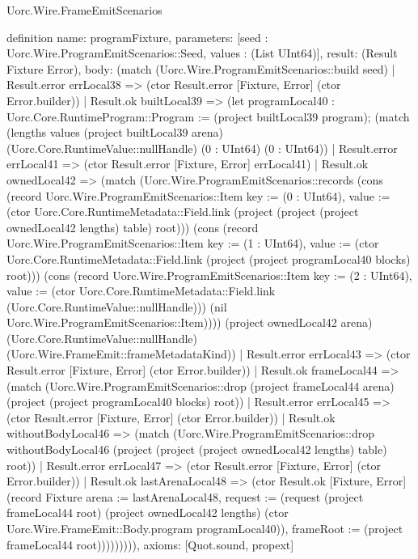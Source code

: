 \begin{lexlean}{Uorc.Wire.FrameEmitScenarios}
\begin{semanticmodule}
definition{
  name: programFixture,
  parameters: [seed : Uorc.Wire.ProgramEmitScenarios::Seed, values : (List UInt64)],
  result: (Result Fixture Error),
  body: (match (Uorc.Wire.ProgramEmitScenarios::build seed)
    | Result.error errLocal38 => (ctor Result.error [Fixture, Error] (ctor Error.builder))
    | Result.ok builtLocal39 => (let programLocal40 : Uorc.Core.RuntimeProgram::Program := (project builtLocal39 program); (match (lengths values (project builtLocal39 arena) (Uorc.Core.RuntimeValue::nullHandle) (0 : UInt64) (0 : UInt64))
      | Result.error errLocal41 => (ctor Result.error [Fixture, Error] errLocal41)
      | Result.ok ownedLocal42 => (match (Uorc.Wire.ProgramEmitScenarios::records (cons (record Uorc.Wire.ProgramEmitScenarios::Item {key := (0 : UInt64), value := (ctor Uorc.Core.RuntimeMetadata::Field.link (project (project (project ownedLocal42 lengths) table) root))}) (cons (record Uorc.Wire.ProgramEmitScenarios::Item {key := (1 : UInt64), value := (ctor Uorc.Core.RuntimeMetadata::Field.link (project (project programLocal40 blocks) root))}) (cons (record Uorc.Wire.ProgramEmitScenarios::Item {key := (2 : UInt64), value := (ctor Uorc.Core.RuntimeMetadata::Field.link (Uorc.Core.RuntimeValue::nullHandle))}) (nil Uorc.Wire.ProgramEmitScenarios::Item)))) (project ownedLocal42 arena) (Uorc.Core.RuntimeValue::nullHandle) (Uorc.Wire.FrameEmit::frameMetadataKind))
        | Result.error errLocal43 => (ctor Result.error [Fixture, Error] (ctor Error.builder))
        | Result.ok frameLocal44 => (match (Uorc.Wire.ProgramEmitScenarios::drop (project frameLocal44 arena) (project (project programLocal40 blocks) root))
          | Result.error errLocal45 => (ctor Result.error [Fixture, Error] (ctor Error.builder))
          | Result.ok withoutBodyLocal46 => (match (Uorc.Wire.ProgramEmitScenarios::drop withoutBodyLocal46 (project (project (project ownedLocal42 lengths) table) root))
            | Result.error errLocal47 => (ctor Result.error [Fixture, Error] (ctor Error.builder))
            | Result.ok lastArenaLocal48 => (ctor Result.ok [Fixture, Error] (record Fixture {arena := lastArenaLocal48, request := (request (project frameLocal44 root) (project ownedLocal42 lengths) (ctor Uorc.Wire.FrameEmit::Body.program programLocal40)), frameRoot := (project frameLocal44 root)})))))))),
  axioms: [Quot.sound, propext]
}


\end{semanticmodule}
\end{lexlean}
